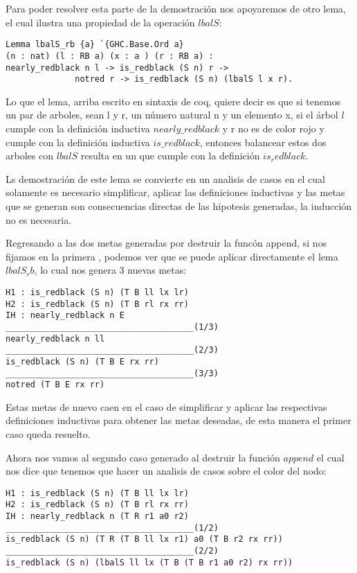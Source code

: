 Para poder resolver esta parte de la demostraci\'on nos apoyaremos de otro lema, el cual ilustra
una propiedad de la operaci\'on $lbalS$:

\begin{verbatim}
Lemma lbalS_rb {a} `{GHC.Base.Ord a}
(n : nat) (l : RB a) (x : a ) (r : RB a) :
nearly_redblack n l -> is_redblack (S n) r ->
              notred r -> is_redblack (S n) (lbalS l x r).
\end{verbatim}

Lo que el lema, arriba escrito en sintaxis de coq, quiere decir es que si tenemos un par de
arboles, sean l y r, un n\'umero natural n y un elemento x, si el \'arbol $l$ cumple con la
definici\'on inductiva $nearly\_redblack$ y r no es de color rojo y cumple con la definici\'on
inductiva $is\_redblack$, entonces balancear estos dos arboles con $lbalS$ resulta en un {\arn}
que cumple con la definici\'on $is_redblack$.

Ls demostraci\'on de este lema se convierte en un analisis de casos en el cual solamente es
necesario simplificar, aplicar las definiciones inductivas y las metas que se generan son
consecuencias directas de las hipotesis generadas, la inducci\'on no es necesaria.

Regresando a las dos metas generadas por destruir la func\'on append, si nos fijamos en la primera
, podemos ver que se puede aplicar directamente el lema $lbalS_rb$, lo cual nos genera 3 nuevas metas:

\begin{verbatim}
H1 : is_redblack (S n) (T B ll lx lr)
H2 : is_redblack (S n) (T B rl rx rr)
IH : nearly_redblack n E
______________________________________(1/3)
nearly_redblack n ll
______________________________________(2/3)
is_redblack (S n) (T B E rx rr)
______________________________________(3/3)
notred (T B E rx rr)
\end{verbatim}

Estas metas de nuevo caen en el caso de simplificar y aplicar las respectivas definiciones
inductivas para obtener las metas deseadas, de esta manera el primer caso queda resuelto.

Ahora nos vamos al segundo caso generado al destruir la funci\'on $append$ el cual nos dice que
tenemos que hacer un analisis de casos sobre el color del nodo:

\begin{verbatim}
H1 : is_redblack (S n) (T B ll lx lr)
H2 : is_redblack (S n) (T B rl rx rr)
IH : nearly_redblack n (T R r1 a0 r2)
______________________________________(1/2)
is_redblack (S n) (T R (T B ll lx r1) a0 (T B r2 rx rr))
______________________________________(2/2)
is_redblack (S n) (lbalS ll lx (T B (T B r1 a0 r2) rx rr))
\end{verbatim}

